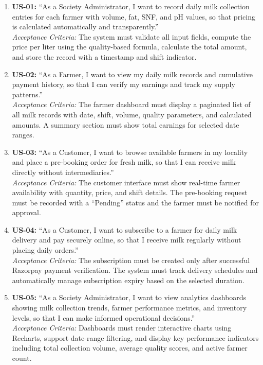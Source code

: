 \documentclass[12pt,a4paper]{report}
\begin{document}
\begin{enumerate}
    \item \textbf{US-01:} ``As a Society Administrator, I want to record daily milk collection entries for each farmer with volume, fat, SNF, and pH values, so that pricing is calculated automatically and transparently.'' \\
    \textit{Acceptance Criteria:} The system must validate all input fields, compute the price per liter using the quality-based formula, calculate the total amount, and store the record with a timestamp and shift indicator.

    \item \textbf{US-02:} ``As a Farmer, I want to view my daily milk records and cumulative payment history, so that I can verify my earnings and track my supply patterns.'' \\
    \textit{Acceptance Criteria:} The farmer dashboard must display a paginated list of all milk records with date, shift, volume, quality parameters, and calculated amounts. A summary section must show total earnings for selected date ranges.

    \item \textbf{US-03:} ``As a Customer, I want to browse available farmers in my locality and place a pre-booking order for fresh milk, so that I can receive milk directly without intermediaries.'' \\
    \textit{Acceptance Criteria:} The customer interface must show real-time farmer availability with quantity, price, and shift details. The pre-booking request must be recorded with a ``Pending'' status and the farmer must be notified for approval.

    \item \textbf{US-04:} ``As a Customer, I want to subscribe to a farmer for daily milk delivery and pay securely online, so that I receive milk regularly without placing daily orders.'' \\
    \textit{Acceptance Criteria:} The subscription must be created only after successful Razorpay payment verification. The system must track delivery schedules and automatically manage subscription expiry based on the selected duration.

    \item \textbf{US-05:} ``As a Society Administrator, I want to view analytics dashboards showing milk collection trends, farmer performance metrics, and inventory levels, so that I can make informed operational decisions.'' \\
    \textit{Acceptance Criteria:} Dashboards must render interactive charts using Recharts, support date-range filtering, and display key performance indicators including total collection volume, average quality scores, and active farmer count.
\end{enumerate}
\end{document}
